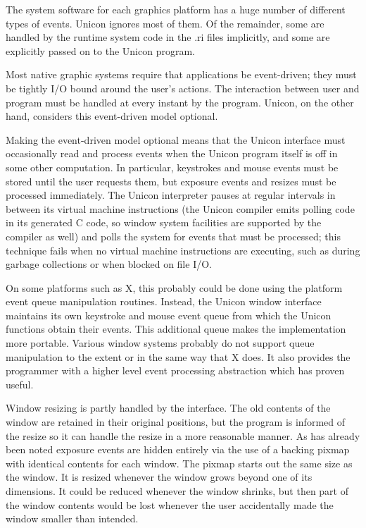 The system software for each graphics platform has a huge number of
different types of events. Unicon ignores most of them. Of the
remainder, some are handled by the runtime system code in the
\textsf{.ri} files implicitly, and some are explicitly passed on to
the Unicon program.

Most native graphic systems require that applications be event-driven;
they must be tightly I/O bound around the user's actions. The
interaction between user and program must be handled at every instant
by the program. Unicon, on the other hand, considers this event-driven
model optional.


Making the event-driven model optional means that the Unicon interface
must occasionally read and process events when the Unicon program
itself is off in some other computation. In particular, keystrokes and
mouse events must be stored until the user requests them, but exposure
events and resizes must be processed immediately. The Unicon
interpreter pauses at regular intervals in between its virtual machine
instructions (the Unicon compiler emits polling code in its generated
C code, so window system facilities are supported by the compiler as
well) and polls the system for events that must be processed; this
technique fails when no virtual machine instructions are executing,
such as during garbage collections or when blocked on file I/O.

On some platforms such as X, this probably could be done using the
platform event queue manipulation routines.  Instead, the Unicon
window interface maintains its own keystroke and mouse event queue
from which the Unicon functions obtain their events. This additional
queue makes the implementation more portable. Various window systems
probably do not support queue manipulation to the extent or in the
same way that X does. It also provides the programmer with a higher
level event processing abstraction which has proven useful.

Window resizing is partly handled by the interface. The old contents
of the window are retained in their original positions, but the
program is informed of the resize so it can handle the resize in a
more reasonable manner. As has already been noted exposure events are
hidden entirely via the use of a backing pixmap with identical
contents for each window. The pixmap starts out the same size as the
window. It is resized whenever the window grows beyond one of its
dimensions. It could be reduced whenever the window shrinks, but then
part of the window contents would be lost whenever the user
accidentally made the window smaller than intended.


